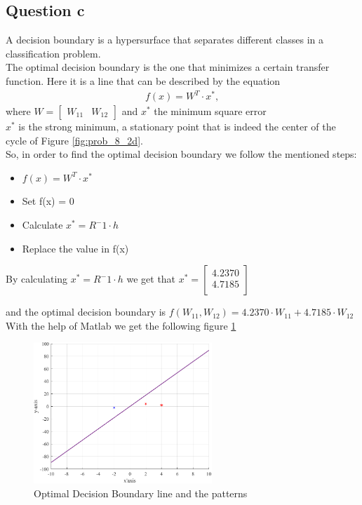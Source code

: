 \vspace{2cm}
\subsection{Question c}
A decision boundary is a hypersurface that separates different classes in a classification problem.\\
The optimal decision boundary is the one that minimizes a certain transfer function. Here it is a line that can be described by the equation 
\[
\begin{gathered}
	f(x) = W^T \cdot x^*, 
\end{gathered}
\]
where $
W=\left[\begin{array}{cc}
	W_{11} & W_{12}
\end{array}
\right]
$ and $x^*$ the minimum square error \\
$x^*$ is the strong minimum, a stationary point that is indeed the center of the cycle of Figure \ref{fig:prob_8_2d}.\\

So, in order to find the optimal decision boundary we follow the mentioned steps:
\begin{itemize}
	\item $f(x) = W^T \cdot x^*$
	\item Set f(x) = 0
	\item Calculate $x^* = R^-1 \cdot h$
	\item Replace the value in f(x)
\end{itemize}

By calculating $x^* = R^-1 \cdot h$ we get that $x^* = \left[\begin{array}{c}
															4.2370 \\
															4.7185 \\
														\end{array}
														\right] $

\vspace{5mm}
and the optimal decision boundary is $f(W_{11},W_{12}) = 4.2370 \cdot W_{11} + 4.7185 \cdot W_{12} $ \\

With the help of Matlab we get the following figure \ref{fig:patterns}

\begin{figure}[H]
	\centering
	\includegraphics[width = 0.6\textwidth]{../Problem 8/patterns.pdf}
	\caption{Optimal Decision Boundary line and the patterns}
	\label{fig:patterns}
\end{figure}


